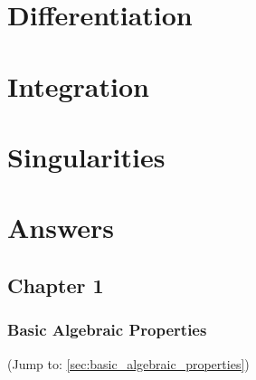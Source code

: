\documentclass[11pt, oneside]{book}
\begin{document}


\chapter{Differentiation}
	\label{chapter:differentiation}




\chapter{Integration}
	\label{chapter:integration}




\chapter{Singularities}
	\label{chapter:singularities}




\chapter*{Answers}\label{chapter:answers}

\fontsize{9}{11}\selectfont

\section*{Chapter 1} %
\label{sec:chapter_1}

\subsection*{Basic Algebraic Properties} %
\label{sub:basic_algebraic_properties}

(Jump to: \cref{sec:basic_algebraic_properties})
\end{document}
